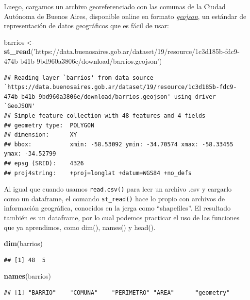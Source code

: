 \documentclass[]{book}
\newenvironment{Shaded}{\begin{snugshade}}{\end{snugshade}}
\newcommand{\KeywordTok}[1]{\textcolor[rgb]{0.13,0.29,0.53}{\textbf{#1}}}
\newcommand{\StringTok}[1]{\textcolor[rgb]{0.31,0.60,0.02}{#1}}
\newcommand{\NormalTok}[1]{#1}
\begin{document}
Luego, cargamos un archivo georeferenciado con las comunas de la Ciudad
Autónoma de Buenos Aires, disponible online en formato
\href{https://es.wikipedia.org/wiki/GeoJSON}{\emph{geojson}}, un
estándar de representación de datos geográficos que es fácil de usar:

\begin{Shaded}
\begin{Highlighting}[]
\NormalTok{barrios <-}\StringTok{ }\KeywordTok{st_read}\NormalTok{(}\StringTok{'https://data.buenosaires.gob.ar/dataset/19/resource/1c3d185b-fdc9-474b-b41b-9bd960a3806e/download/barrios.geojson'}\NormalTok{)}
\end{Highlighting}
\end{Shaded}

\begin{verbatim}
## Reading layer `barrios' from data source `https://data.buenosaires.gob.ar/dataset/19/resource/1c3d185b-fdc9-474b-b41b-9bd960a3806e/download/barrios.geojson' using driver `GeoJSON'
## Simple feature collection with 48 features and 4 fields
## geometry type:  POLYGON
## dimension:      XY
## bbox:           xmin: -58.53092 ymin: -34.70574 xmax: -58.33455 ymax: -34.52799
## epsg (SRID):    4326
## proj4string:    +proj=longlat +datum=WGS84 +no_defs
\end{verbatim}

Al igual que cuando usamos \texttt{read.csv()} para leer un archivo .csv
y cargarlo como un dataframe, el comando \texttt{st\_read()} hace lo
propio con archivos de información geográfica, conocidos en la jerga
como ``shapefiles''. El resultado también es un dataframe, por lo cual
podemos practicar el uso de las funciones que ya aprendimos, como dim(),
names() y head().

\begin{Shaded}
\begin{Highlighting}[]
\KeywordTok{dim}\NormalTok{(barrios)}
\end{Highlighting}
\end{Shaded}

\begin{verbatim}
## [1] 48  5
\end{verbatim}

\begin{Shaded}
\begin{Highlighting}[]
\KeywordTok{names}\NormalTok{(barrios)}
\end{Highlighting}
\end{Shaded}

\begin{verbatim}
## [1] "BARRIO"    "COMUNA"    "PERIMETRO" "AREA"      "geometry"
\end{verbatim}
\end{document}

